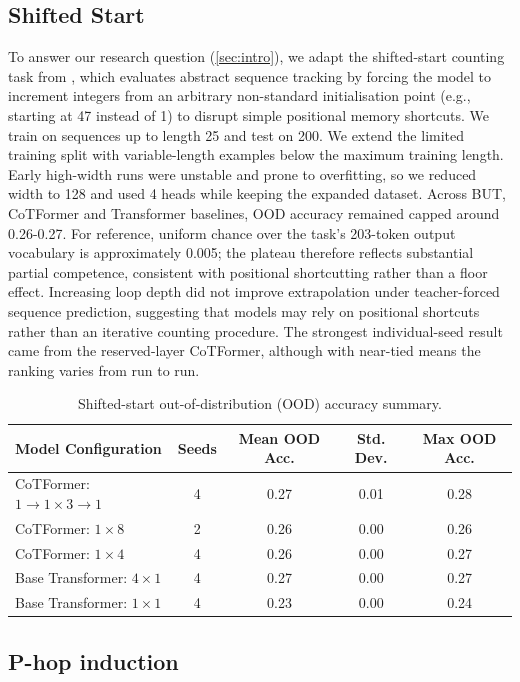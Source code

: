 \documentclass[10pt]{article}
\begin{document}
\subsection{Shifted Start}
To answer our research question (\cref{sec:intro}), we adapt the shifted-start counting task from \citet{chang2025counting}, which evaluates abstract sequence tracking by forcing the model to increment integers from an arbitrary non-standard initialisation point (e.g., starting at 47 instead of 1) to disrupt simple positional memory shortcuts. We train on sequences up to length 25 and test on 200. We extend the limited training split with variable-length examples below the maximum training length. Early high-width runs were unstable and prone to overfitting, so we reduced width to 128 and used 4 heads while keeping the expanded dataset. Across BUT, CoTFormer and Transformer baselines, OOD accuracy remained capped around 0.26-0.27. For reference, uniform chance over the task's 203-token output vocabulary is approximately 0.005; the plateau therefore reflects substantial partial competence, consistent with positional shortcutting rather than a floor effect. Increasing loop depth did not improve extrapolation under teacher-forced sequence prediction, suggesting that models may rely on positional shortcuts rather than an iterative counting procedure. The strongest individual-seed result came from the reserved-layer CoTFormer, although with near-tied means the ranking varies from run to run.

\begin{table}[!ht]
\centering
\small
\setlength{\tabcolsep}{6.0pt}
\begin{tabular}{lcccc}
\toprule
Model Configuration & Seeds & Mean OOD Acc. & Std. Dev. & Max OOD Acc. \\
\midrule
CoTFormer: \(1 \to 1{\times}3 \to 1\) & 4 & 0.27 & 0.01 & 0.28 \\
CoTFormer: \(1{\times}8\)             & 2 & 0.26 & 0.00 & 0.26 \\
CoTFormer: \(1{\times}4\)             & 4 & 0.26 & 0.00 & 0.27 \\
Base Transformer: \(4{\times}1\)      & 4 & 0.27 & 0.00 & 0.27 \\
Base Transformer: \(1{\times}1\)      & 4 & 0.23 & 0.00 & 0.24 \\
\bottomrule
\end{tabular}
\caption{Shifted-start out-of-distribution (OOD) accuracy summary.}
\label{tab:ood_acc_summary}
\end{table}
\subsection{P-hop induction}
\end{document}
